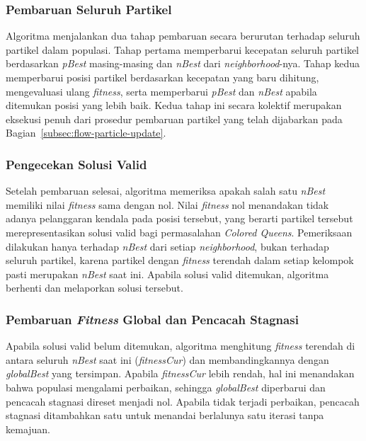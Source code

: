 \subsubsection{Pembaruan Seluruh Partikel}

Algoritma menjalankan dua tahap pembaruan secara berurutan terhadap seluruh partikel dalam populasi. Tahap pertama memperbarui kecepatan seluruh partikel berdasarkan \textit{pBest} masing-masing dan \textit{nBest} dari \textit{neighborhood}-nya. Tahap kedua memperbarui posisi partikel berdasarkan kecepatan yang baru dihitung, mengevaluasi ulang \textit{fitness}, serta memperbarui \textit{pBest} dan \textit{nBest} apabila ditemukan posisi yang lebih baik. Kedua tahap ini secara kolektif merupakan eksekusi penuh dari prosedur pembaruan partikel yang telah dijabarkan pada Bagian~\ref{subsec:flow-particle-update}.

\subsubsection{Pengecekan Solusi Valid}

Setelah pembaruan selesai, algoritma memeriksa apakah salah satu \textit{nBest} memiliki nilai \textit{fitness} sama dengan nol. Nilai \textit{fitness} nol menandakan tidak adanya pelanggaran kendala pada posisi tersebut, yang berarti partikel tersebut merepresentasikan solusi valid bagi permasalahan \textit{Colored Queens}. Pemeriksaan dilakukan hanya terhadap \textit{nBest} dari setiap \textit{neighborhood}, bukan terhadap seluruh partikel, karena partikel dengan \textit{fitness} terendah dalam setiap kelompok pasti merupakan \textit{nBest} saat ini. Apabila solusi valid ditemukan, algoritma berhenti dan melaporkan solusi tersebut.

\subsubsection{Pembaruan \textit{Fitness} Global dan Pencacah Stagnasi}

Apabila solusi valid belum ditemukan, algoritma menghitung \textit{fitness} terendah di antara seluruh \textit{nBest} saat ini (\textit{fitnessCur}) dan membandingkannya dengan \textit{globalBest} yang tersimpan. Apabila \textit{fitnessCur} lebih rendah, hal ini menandakan bahwa populasi mengalami perbaikan, sehingga \textit{globalBest} diperbarui dan pencacah stagnasi direset menjadi nol. Apabila tidak terjadi perbaikan, pencacah stagnasi ditambahkan satu untuk menandai berlalunya satu iterasi tanpa kemajuan.

